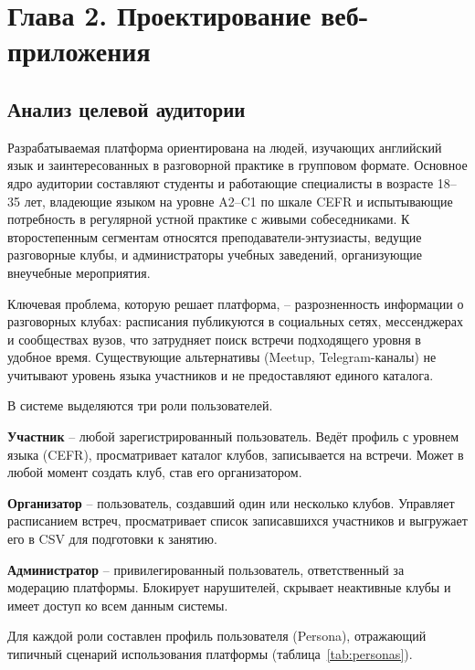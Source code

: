 \section*{Глава 2. Проектирование веб-приложения}

\subsection{Анализ целевой аудитории}

Разрабатываемая платформа ориентирована на людей, изучающих английский язык
и заинтересованных в разговорной практике в групповом формате. Основное ядро
аудитории составляют студенты и работающие специалисты в возрасте 18--35 лет,
владеющие языком на уровне A2--C1 по шкале CEFR и испытывающие потребность
в регулярной устной практике с живыми собеседниками. К второстепенным сегментам
относятся преподаватели-энтузиасты, ведущие разговорные клубы, и администраторы
учебных заведений, организующие внеучебные мероприятия.

Ключевая проблема, которую решает платформа, -- разрозненность информации
о разговорных клубах: расписания публикуются в социальных сетях, мессенджерах
и сообществах вузов, что затрудняет поиск встречи подходящего уровня
в удобное время. Существующие альтернативы (Meetup, Telegram-каналы)
не учитывают уровень языка участников и не предоставляют единого каталога.

В системе выделяются три роли пользователей.

\textbf{Участник} -- любой зарегистрированный пользователь. Ведёт профиль
с уровнем языка (CEFR), просматривает каталог клубов, записывается на встречи.
Может в любой момент создать клуб, став его организатором.

\textbf{Организатор} -- пользователь, создавший один или несколько клубов.
Управляет расписанием встреч, просматривает список записавшихся участников
и выгружает его в CSV для подготовки к занятию.

\textbf{Администратор} -- привилегированный пользователь, ответственный за
модерацию платформы. Блокирует нарушителей, скрывает неактивные клубы
и имеет доступ ко всем данным системы.

Для каждой роли составлен профиль пользователя (Persona), отражающий типичный
сценарий использования платформы (таблица~\ref{tab:personas}).

